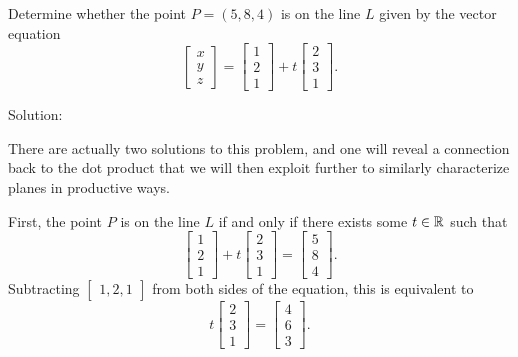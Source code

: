 \documentclass{ximera}
\begin{document}
\begin{example}\label{ex:point-on-line}

  Determine whether the point $P=(5,8,4)$ is on the line $L$ given by
  the vector equation
  \begin{equation*}
    \begin{bmatrix} x \\ y \\ z \end{bmatrix}
    = \begin{bmatrix} 1 \\ 2 \\ 1 \end{bmatrix}
    + t \begin{bmatrix} 2 \\ 3 \\ 1 \end{bmatrix}.
  \end{equation*}


Solution:

  There are actually two solutions to this problem, and one will reveal a connection back to the dot product that we will then exploit further to similarly characterize planes in productive ways.

  First, the point $P$ is on the line $L$ if and only if there exists some
  $t\in\mathbb{R}$ such that
  \begin{equation*}
    \begin{bmatrix} 1 \\ 2 \\ 1 \end{bmatrix}
    + t \begin{bmatrix} 2 \\ 3 \\ 1 \end{bmatrix}
    = \begin{bmatrix} 5 \\ 8 \\ 4 \end{bmatrix}.
  \end{equation*}
  Subtracting $\begin{bmatrix}1,2,1\end{bmatrix}$ from both sides of the equation, this is
  equivalent to
  \begin{equation*}
    t \begin{bmatrix} 2 \\ 3 \\ 1 \end{bmatrix}
    = \begin{bmatrix} 4 \\ 6 \\ 3 \end{bmatrix}.
  \end{equation*}


\end{example}
\end{document}
